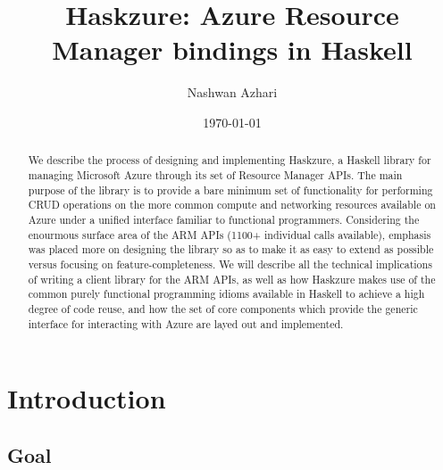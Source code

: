 \documentclass[11pt]{report}
\begin{document}
\date{\today{}}
\title{Haskzure: Azure Resource Manager bindings in Haskell}
\author{Nashwan Azhari}

\maketitle{}

\begin{abstract}

We describe the process of designing and implementing Haskzure, a Haskell
library for managing Microsoft Azure through its set of Resource Manager APIs. The
main purpose of the library is to provide a bare minimum set of functionality
for performing CRUD operations on the more common compute and networking
resources available on Azure under a unified interface familiar to functional
programmers.
Considering the enourmous surface area of the ARM APIs (1100+ individual calls
available), emphasis was placed more on designing the library so as to make it
as easy to extend as possible versus focusing on feature-completeness. \newline
We will describe all the technical implications of writing a client library for
the ARM APIs, as well as  how Haskzure makes use of the common purely
functional programming idioms available in Haskell to achieve a high degree of
code reuse, and how the set of core components which provide the generic
interface for interacting with Azure are layed out and implemented.

\end{abstract}

\tableofcontents{}

\renewcommand\listoflistingscaption{Listings:}
\listoflistings

\chapter{Introduction}

\section{Goal}
\end{document}
